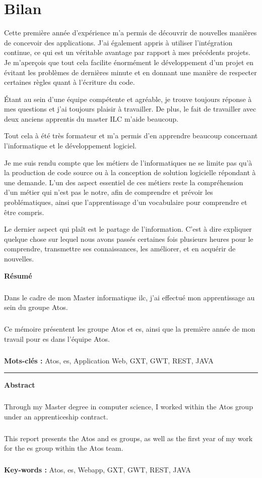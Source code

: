 \documentclass[12pt]{report}
\newcommand{\printAbstract}[4]
{
    \newpage
    \thispagestyle{empty}
    \setlength{\parskip}{-0.5em}
    \vspace*{\fill}
    \vspace{2em}
    \noindent\textbf{\LARGE Résumé}\\
    \p
    #1
    \p
    \textbf{Mots-clés :} #2
    \vspace{1em}
    \hrule
    \vspace{1.5em}
    \noindent\textbf{\LARGE Abstract}\\
    \p
    #3
    \p
    \textbf{Key-words : } #4
    \vspace*{\fill}
}
\newcommand{\fin}
{
    \label{Fin}
    \printglossary
    \printglossary[type=\acronymtype]
    \printbibliography[heading=bibintoc,title={Bibliographie}] %
}
\newcommand{\p}{\paragraph{}}
\begin{document}
    \chapter{Bilan}
    
    Cette première année d’expérience m’a permis de découvrir de nouvelles manières de concevoir des applications. J’ai également appris à utiliser l’intégration continue, ce qui est un véritable
    avantage par rapport à mes précédents projets. Je m’aperçois que tout cela facilite énormément le développement d’un projet en évitant les problèmes de dernières minute et en donnant une manière de respecter certaines règles quant à l’écriture du code.
    
    Étant au sein d’une équipe compétente et agréable, je trouve toujours réponse à mes questions et j’ai toujours plaisir à travailler. De plus, le fait de travailler avec deux anciens apprentis du master ILC m'aide beaucoup.
    
    Tout cela à été très formateur et m’a permis d’en apprendre beaucoup concernant l’informatique et le développement logiciel.
    
    Je me suis rendu compte que les métiers de l'informatiques ne se limite pas qu'à la production de code source ou à la conception de solution logicielle répondant à une demande. L'un des aspect essentiel de ces métiers reste la compréhension d'un métier qui n'est pas le notre, afin de comprendre et prévoir les problématiques, ainsi que l'apprentissage d'un vocabulaire pour comprendre et être compris.
    
    Le dernier aspect qui plaît est le partage de l'information. C'est à dire expliquer quelque chose sur lequel nous avons passés certaines fois plusieurs heures pour le comprendre, transmettre ses connaissances, les améliorer, et en acquérir de nouvelles.
    
	\fin
	
    \printAbstract{
        Dans le cadre de mon Master informatique \acrlong{ilc}, j'ai effectué mon apprentissage au sein du groupe Atos.
        \p
        Ce mémoire présentent les groupe Atos et \acrshort{es}, ainsi que la première année de mon travail pour \acrshort{es} dans l'équipe Atos.
    }
    {Atos, \acrshort{es}, Application Web, GXT, GWT, REST, JAVA}
    {
        Through my Master degree in computer science, I worked within the Atos group under an apprenticeship contract.
        \p
        This report presents the Atos and \acrshort{es} groups, as well as the first year of my work for the \acrshort{es} group within the Atos team.
    }
    {Atos, \acrshort{es}, Webapp, GXT, GWT, REST, JAVA}
    
\end{document}
